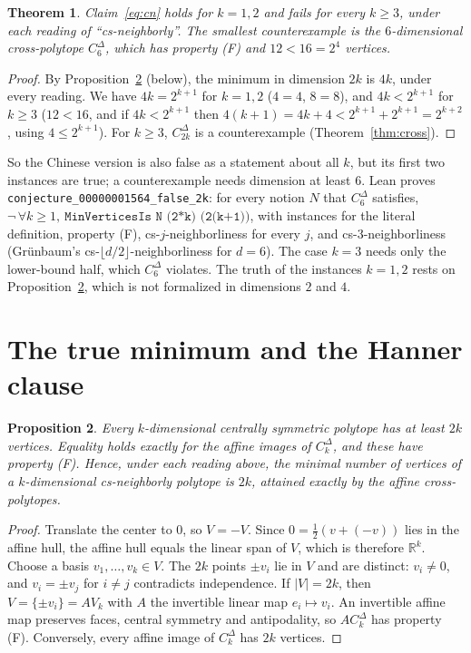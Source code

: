 \documentclass[11pt]{article}
\newtheorem{theorem}{Theorem}
\newtheorem{proposition}[theorem]{Proposition}
\theoremstyle{definition}
\theoremstyle{remark}
\begin{document}
\begin{theorem}\label{thm:cn}
Claim~\eqref{eq:cn} holds for $k=1,2$ and fails for every $k\ge3$, under each reading of
``cs-neighborly''. The smallest counterexample is the $6$-dimensional cross-polytope
$C^\Delta_6$, which has property (F) and $12<16=2^{4}$ vertices.
\end{theorem}
\begin{proof}
By Proposition~\ref{prop:true} (below), the minimum in dimension $2k$ is $4k$, under every
reading. We have $4k=2^{k+1}$ for $k=1,2$ ($4=4$, $8=8$), and $4k<2^{k+1}$ for $k\ge3$
($12<16$, and if $4k<2^{k+1}$ then $4(k+1)=4k+4<2^{k+1}+2^{k+1}=2^{k+2}$, using
$4\le 2^{k+1}$). For $k\ge3$, $C^\Delta_{2k}$ is a counterexample (Theorem~\ref{thm:cross}).
\end{proof}
So the Chinese version is also false as a statement about all $k$, but its first two instances
are true; a counterexample needs dimension at least $6$. Lean proves
\texttt{conjecture\_00000001564\_false\_2k}: for every notion $N$ that $C^\Delta_6$ satisfies,
$\neg\,\forall k\ge1,\ \texttt{MinVerticesIs N (2*k) (2\^{}(k+1))}$, with instances for the
literal definition, property (F), cs-$j$-neighborliness for every $j$, and cs-$3$-neighborliness
(Gr\"unbaum's cs-$\lfloor d/2\rfloor$-neighborliness for $d=6$). The case $k=3$ needs only the
lower-bound half, which $C^\Delta_6$ violates. The truth of the instances $k=1,2$ rests on
Proposition~\ref{prop:true}, which is not formalized in dimensions $2$ and $4$.

\section{The true minimum and the Hanner clause}
\begin{proposition}\label{prop:true}
Every $k$-dimensional centrally symmetric polytope has at least $2k$ vertices. Equality
holds exactly for the affine images of $C^\Delta_k$, and these have property (F). Hence,
under each reading above, the minimal number of vertices of a $k$-dimensional
cs-neighborly polytope is $2k$, attained exactly by the affine cross-polytopes.
\end{proposition}
\begin{proof}
Translate the center to $0$, so $V=-V$. Since $0=\frac12(v+(-v))$ lies in the
affine hull, the affine hull equals the linear span of $V$, which is therefore $\mathbb R^k$.
Choose a basis $v_1,\dots,v_k\in V$. The $2k$ points $\pm v_i$ lie in $V$ and are distinct:
$v_i\ne0$, and $v_i=\pm v_j$ for $i\ne j$ contradicts independence. If $|V|=2k$, then
$V=\{\pm v_i\}=A V_k$ with $A$ the invertible linear map $e_i\mapsto v_i$. An invertible
affine map preserves faces, central symmetry and antipodality, so $A C^\Delta_k$ has
property (F). Conversely, every affine image of $C^\Delta_k$ has $2k$ vertices.
\end{proof}
\end{document}
